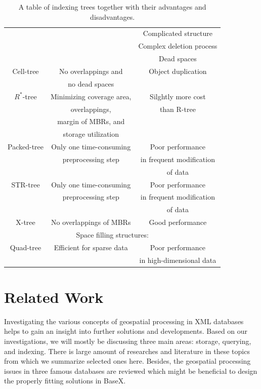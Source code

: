 \documentclass[a4paper,12pt]{article}
\begin{document}
\begin{table}
\begin{tabular}{| c | c | c |}
           &                             & Complicated structure\\
           &                             & Complex deletion process\\
           &                             & Dead spaces\\\hline
Cell-tree  & No overlappings and & Object duplication\\
          & no dead spaces      &        \\\hline
$R^*$-tree  & Minimizing coverage area,  & Silghtly more cost\\
           &  overlappings,& than R-tree\\
            &  margin of MBRs, and& \\
            &  storage utilization          &\\\hline
Packed-tree & Only one time-consuming & Poor performance \\
             &  preprocessing step  & in frequent modification\\
             &                      &   of data \\\hline
STR-tree  & Only one time-consuming  & Poor performance \\
           &  preprocessing step       & in frequent modification\\
          &                      &   of data \\\hline
X-tree  & No overlappings of MBRs & Good performance\\\hline
 \multicolumn{3}{c}{Space filling structures:}\\\hline
Quad-tree   & Efficient for sparse data & Poor performance \\
            &                           & in high-dimensional data\\\hline
\end{tabular}
\caption{A table of indexing trees together with
their advantages and disadvantages.}
\label{t.tree}
\end{table}


\newpage


\section{Related Work}
\label{s.rwork}
Investigating the various concepts of geospatial processing in XML databases helps to gain an insight into further solutions and developments. 
Based on our investigations, we will mostly be discussing three main areas: storage, querying, and indexing. There is large amount of researches and literature in these topics from which we summarize selected ones here. Besides, the geospatial processing issues in three famous databases are reviewed which might be beneficial to design the properly fitting solutions in BaseX. %
\end{document}
